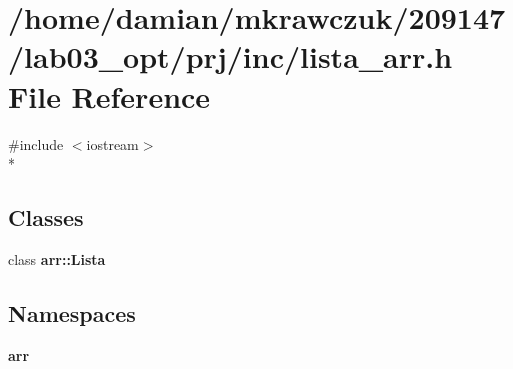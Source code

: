 \section{/home/damian/mkrawczuk/209147/lab03\-\_\-opt/prj/inc/lista\-\_\-arr.h File Reference}
\label{lista__arr_8h}
{\ttfamily \#include $<$iostream$>$}\\*
\subsection*{Classes}
\begin{DoxyCompactItemize}
\item 
class {\bf arr\-::\-Lista}
\end{DoxyCompactItemize}
\subsection*{Namespaces}
\begin{DoxyCompactItemize}
\item 
{\bf arr}
\end{DoxyCompactItemize}
